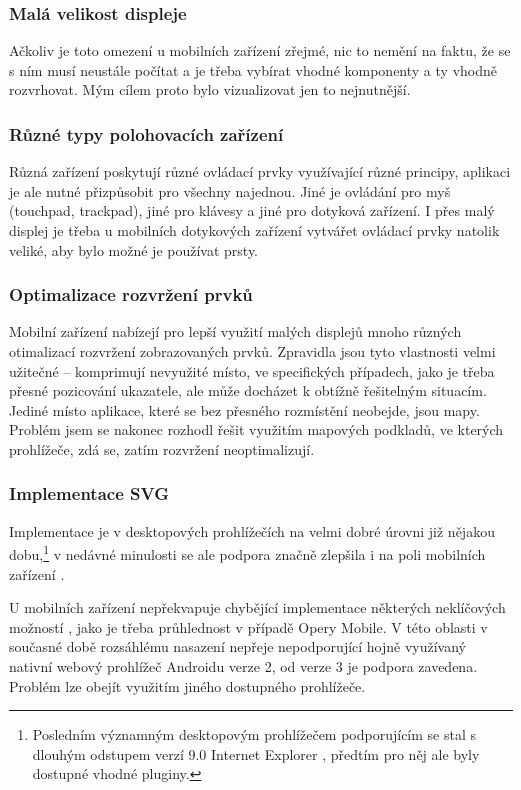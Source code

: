 \subsubsection{Malá velikost displeje}
Ačkoliv je toto omezení u mobilních zařízení zřejmé, nic to nemění na faktu, že se s ním musí neustále počítat a je třeba vybírat vhodné komponenty a ty vhodně rozvrhovat. Mým cílem proto bylo vizualizovat jen to nejnutnější.

\subsubsection{Různé typy polohovacích zařízení}
Různá zařízení poskytují různé ovládací prvky využívající různé principy, aplikaci je ale nutné přizpůsobit pro všechny najednou. Jiné je ovládání pro myš (touchpad, trackpad), jiné pro klávesy a jiné pro dotyková zařízení. I přes malý displej je třeba u mobilních dotykových zařízení vytvářet ovládací prvky natolik veliké, aby bylo možné je používat prsty.

\subsubsection{Optimalizace rozvržení prvků}
Mobilní zařízení nabízejí pro lepší využití malých displejů mnoho různých otimalizací rozvržení zobrazovaných prvků. Zpravidla jsou tyto vlastnosti velmi užitečné -- komprimují nevyužité místo, ve specifických případech, jako je třeba přesné pozicování ukazatele, ale může docházet k obtížně řešitelným situacím. Jediné místo aplikace, které se bez přesného rozmístění neobejde, jsou mapy. Problém jsem se nakonec rozhodl řešit využitím   mapových podkladů, ve kterých prohlížeče, zdá se, zatím rozvržení neoptimalizují.

\subsubsection{Implementace SVG}
Implementace  je v desktopových prohlížečích na velmi dobré úrovni již nějakou dobu,\footnote{Posledním významným desktopovým prohlížečem podporujícím  se stal s dlouhým odstupem verzí 9.0 Internet Explorer \cite{CanIUse}, předtím pro něj ale byly dostupné vhodné pluginy.} v nedávné minulosti se ale podpora značně zlepšila i na poli mobilních zařízení \cite{CanIUse}.

U mobilních zařízení nepřekvapuje chybějící implementace některých neklíčových možností , jako je třeba průhlednost v případě Opery Mobile. V této oblasti v současné době rozsáhlému nasazení nepřeje  nepodporující hojně využívaný nativní webový prohlížeč Androidu verze 2, od verze 3 je podpora zavedena. Problém lze obejít využitím jiného dostupného prohlížeče.

